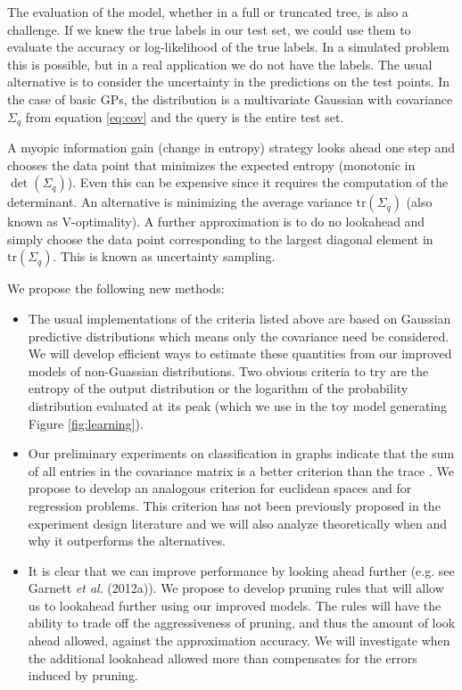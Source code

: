 \documentclass[prd,nofootbib,floatfix,11pt,tightenlines]{revtex4}
\begin{document}
The evaluation of the model, whether in a full or truncated tree, is also a
challenge.  If we knew the true labels in our test set, we could use them
to evaluate the accuracy or log-likelihood of the true labels.  In a
simulated problem this is possible, but in a real application we do not
have the labels.  The usual alternative is to consider the uncertainty in
the predictions on the test points.  In the case of basic GPs, the
distribution is a multivariate Gaussian with covariance $\Sigma_q$ from
equation \ref{eq:cov} and the query is the entire test set.

A myopic information gain (change in entropy) strategy looks ahead one step
and chooses the data point that minimizes the expected entropy (monotonic
in $\det(\Sigma_q)$).  Even this can be expensive since it requires the
computation of the determinant.  An alternative is minimizing the average
variance $\text{tr}(\Sigma_q)$ (also known as V-optimality).  A further
approximation is to do no lookahead and simply choose the data point
corresponding to the largest diagonal element in $\text{tr}(\Sigma_q)$.  This is
known as uncertainty sampling.

We propose the following new methods:

\begin{itemize}

\item The usual implementations of the criteria listed above are based on
  Gaussian predictive distributions which means only the covariance need be
  considered.  We will develop efficient ways to estimate these quantities
  from our improved models of non-Guassian distributions.  Two obvious criteria to try
  are the entropy of the output distribution or the logarithm of the probability
  distribution evaluated at its peak (which we use in the toy model
  generating Figure \ref{fig:learning}).

\item Our preliminary experiments on classification in graphs indicate that
  the sum of all entries in the covariance matrix is a better criterion
  than the trace \cite{YifeiMa12}.  We propose to develop an analogous
  criterion for euclidean spaces and for regression problems.  This
  criterion has not been previously proposed in the experiment design
  literature and we will also analyze theoretically when and why it
  outperforms the alternatives.

\item It is clear that we can improve performance by looking ahead further
  (e.g. see Garnett {\it et al}. (2012a)).  We propose to develop pruning rules that
  will allow us to lookahead further using our improved models.  The rules
  will have the ability to trade off the aggressiveness of pruning, and
  thus the amount of look ahead allowed, against the approximation
  accuracy.  We will investigate when the additional lookahead allowed
  more than compensates for the errors induced by pruning.

\end{itemize}
\end{document}
